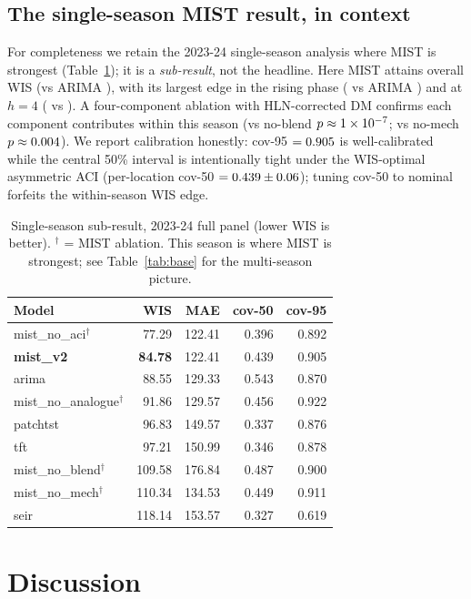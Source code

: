 \documentclass{article}
\begin{document}
\subsection{The single-season MIST result, in context}

For completeness we retain the 2023-24 single-season analysis where MIST is strongest
(Table~\ref{tab:leaderboard}); it is a \emph{sub-result}, not the headline. Here MIST attains
overall WIS \mistWIS{} (vs ARIMA \arimaWIS{}), with its largest edge in the rising phase
(\mistRising{} vs ARIMA \arimaRising{}) and at $h{=}4$ (\mistHfour{} vs \arimaHfour{}). A
four-component ablation with HLN-corrected DM confirms each component contributes within this
season (vs no-blend $p\approx1\times 10^{-7}$; vs no-mech $p\approx0.004$). We report calibration
honestly: cov-95 $=0.905$ is well-calibrated while the central 50\% interval is
intentionally tight under the WIS-optimal asymmetric ACI (per-location cov-50
$=0.439\pm0.06$); tuning cov-50 to nominal forfeits the within-season WIS edge.

\begin{table}[t]
\centering
\caption{Single-season sub-result, 2023-24 full panel (lower WIS is better). $^{\dagger}$ = MIST
ablation. This season is where MIST is strongest; see Table~\ref{tab:base} for the multi-season
picture.}
\label{tab:leaderboard}
\begin{tabular}{lrrrr}
\toprule
Model & WIS & MAE & cov-50 & cov-95 \\
\midrule
mist\_no\_aci$^{\dagger}$ & 77.29 & 122.41 & 0.396 & 0.892 \\
\textbf{mist\_v2} & \textbf{84.78} & 122.41 & 0.439 & 0.905 \\
arima & 88.55 & 129.33 & 0.543 & 0.870 \\
mist\_no\_analogue$^{\dagger}$ & 91.86 & 129.57 & 0.456 & 0.922 \\
patchtst & 96.83 & 149.57 & 0.337 & 0.876 \\
tft & 97.21 & 150.99 & 0.346 & 0.878 \\
mist\_no\_blend$^{\dagger}$ & 109.58 & 176.84 & 0.487 & 0.900 \\
mist\_no\_mech$^{\dagger}$ & 110.34 & 134.53 & 0.449 & 0.911 \\
seir & 118.14 & 153.57 & 0.327 & 0.619 \\
\bottomrule
\end{tabular}
\end{table}

\section{Discussion}
\label{sec:discussion}
\end{document}
